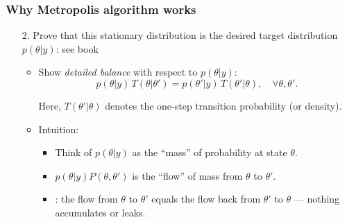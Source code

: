 \documentclass[10pt]{beamer}
\begin{document}
\begin{frame}

\frametitle{Why Metropolis algorithm works}

  \begin{itemize}
  \item[2.] Prove that this stationary distribution is the desired target distribution $p(\theta|y)$: see book

  \begin{itemize}
  \item Show \emph{detailed balance} with respect to
$p(\theta|y)$:
\[
p(\theta|y)\, T(\theta|\theta') = p(\theta'|y)\, T(\theta'|\theta),
\quad \forall \theta, \theta' .
\]

Here, $T(\theta'|\theta)$ denotes the one-step transition probability (or density).
\vspace{3mm} \pause
\item Intuition:
\begin{itemize}
\item Think of $p(\theta|y)$ as the ``mass'' of probability at state $\theta$.\pause
\item $p(\theta|y) P(\theta, \theta')$ is the ``flow'' of mass from $\theta$ to $\theta'$. \pause
\item {}: the flow from $\theta$ to $\theta'$ equals the flow back
from $\theta'$ to $\theta$ --- nothing accumulates or leaks.
\end{itemize}
\end{itemize}
\pause
\vspace{3mm}




\end{itemize}
\end{frame}
\end{document}
